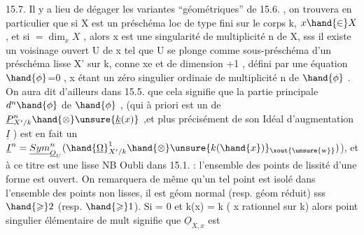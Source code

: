 15.7.   Il y a lieu de dégager les variantes ``géométriques'' de 15.6. ,
on trouvera en particulier que si X est un préschéma loc de type fini sur
le corps k, $x \hand{\in} X$, et si  $= \dim_x X$ , alors  x est une singularité 
 de multiplicité  n de X, sss il existe un voisinage ouvert U de x
tel que U se plonge comme sous-préschéma d'un préschéma lisse X' sur k,
 conne xe et de dimension +1 , défini par une équation $\hand{\phi}$=0 , x étant
un zéro  singulier ordinaie de multiplicité n de $\hand{\phi}$ . On aura dit d'ailleurs
\margin{$\surd$} dans 15.5. que cela signifie  que  la  partie principale $d^n\hand{\phi}$ de $\hand{\phi}$ , 
 (qui à priori est un  de $\underline{P}^n_{X'/k}\hand{\otimes} \unsure{\underline{k}(x)}$ ,et plus
précisément de son Idéal d'augmentation $\underline{I}$ )  est en fait un 
 $\underline{I}^n = \underline{Sym}^n_{\underline{O}_U}(\hand{\underline{\Omega}}^1_{X'/k}\hand{\otimes} \unsure{k(\hand{x})}\textsubscript{\xout{\unsure{w}}})$), et  à ce titre est une   lisse 
\margin{|} \hand{[}NB Oubli dans 15.1. : l'ensemble des points de lissité d'une forme est
\margin{|} ouvert\hand{]}. On remarquera de même qu'un tel point est isolé dans l'ensemble
des points non lisses, il est géom normal  (resp. géom réduit) sss
 $\hand{\geqslant} 2$  (resp.  $\hand{\geqslant} 1$). Si  = 0 et k(x) = k ( x rationnel sur k) alors 
point singulier élémentaire  de mult\hand{\unsure{,}}  signifie que $\underline{O}_{X,x}$  est  

